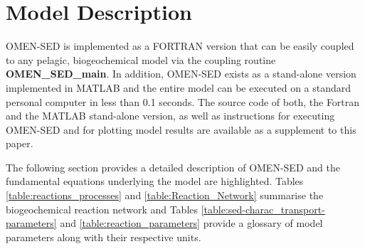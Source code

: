 \documentclass[gmd, manuscript]{copernicus}
\begin{document}


\section{Model Description}\label{sec:model_description}
OMEN-SED is implemented as a FORTRAN version that can be easily coupled to any pelagic, biogeochemical model via the coupling routine \textsf{\textbf{OMEN\_SED\_main}}. 
In addition, OMEN-SED exists as a stand-alone version implemented in MATLAB and the entire model can be executed on a standard personal computer in less than 0.1 seconds. 
The source code of both, the Fortran and the MATLAB stand-alone version, as well as instructions for executing OMEN-SED and for plotting model results are available as a supplement to this paper.

The following section provides a detailed description of OMEN-SED and the fundamental equations underlying the model are highlighted. 
Tables \ref{table:reactions_processes} and \ref{table:Reaction_Network} summarise the biogeochemical reaction network and Tables \ref{table:sed-charac_transport-parameters} 
and \ref{table:reaction_parameters} provide a glossary of model parameters along with their respective units. 
\end{document}
